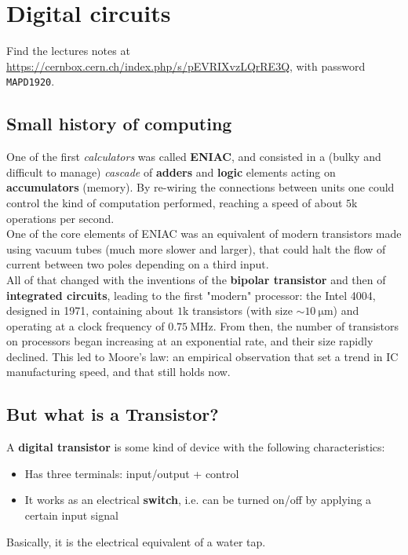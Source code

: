 \documentclass[../template.tex]{subfiles}
\begin{document}
\section{Digital circuits}
Find the lectures notes at \url{https://cernbox.cern.ch/index.php/s/pEVRIXvzLQrRE3Q}, with password \texttt{MAPD1920}.

\subsection{Small history of computing}
One of the first \textit{calculators} was called \textbf{ENIAC}, and consisted in a (bulky and difficult to manage) \textit{cascade} of \textbf{adders} and \textbf{logic} elements acting on \textbf{accumulators} (memory). By re-wiring the connections between units one could control the kind of computation performed, reaching a speed of about $5$k operations per second.\\
One of the core elements of ENIAC was an equivalent of modern transistors made using vacuum tubes (much more slower and larger), that could halt the flow of current between two poles depending on a third input.\\
All of that changed with the inventions of the \textbf{bipolar transistor} and then of \textbf{integrated circuits}, leading to the first "modern" processor: the Intel 4004, designed in 1971, containing about $1$k transistors (with size $\sim \SI{10}{\micro\m}$) and operating at a clock frequency of $\SI{0.75}{\mega\hertz}$. From then, the number of transistors on processors began increasing at an exponential rate, and their size rapidly declined. This led to Moore's law: an empirical observation that set a trend in IC manufacturing speed, and that still holds now.

\subsection{But what is a Transistor?}
A \textbf{digital transistor} is some kind of device with the following characteristics:
\begin{itemize}
    \item Has three terminals: input/output + control
    \item It works as an electrical \textbf{switch}, i.e. can be turned on/off by applying a certain input signal
\end{itemize}
Basically, it is the electrical equivalent of a water tap.\\
\end{document}
